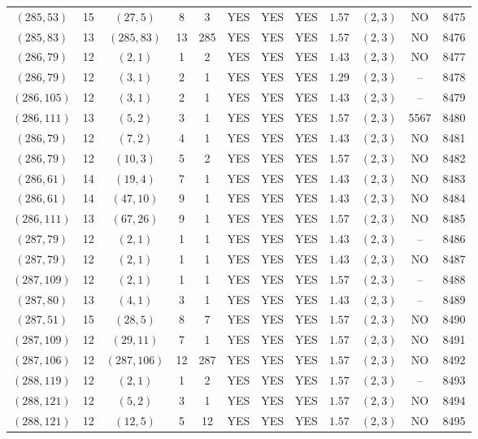 \begin{longtable}{|c|c|c|c|c|c|c|c|c|c|c|c|}
$(285,53)$ & 15 & $(27,5)$ & 8 & 3 & YES & YES & YES & $1.57$ & $(2,3)$ & NO & 8475\\
$(285,83)$ & 13 & $(285,83)$ & 13 & 285 & YES & YES & YES & $1.57$ & $(2,3)$ & NO & 8476\\
$(286,79)$ & 12 & $(2,1)$ & 1 & 2 & YES & YES & YES & $1.43$ & $(2,3)$ & NO & 8477\\
$(286,79)$ & 12 & $(3,1)$ & 2 & 1 & YES & YES & YES & $1.29$ & $(2,3)$ & -- & 8478\\
$(286,105)$ & 12 & $(3,1)$ & 2 & 1 & YES & YES & YES & $1.43$ & $(2,3)$ & -- & 8479\\
$(286,111)$ & 13 & $(5,2)$ & 3 & 1 & YES & YES & YES & $1.57$ & $(2,3)$ & 5567 & 8480\\
$(286,79)$ & 12 & $(7,2)$ & 4 & 1 & YES & YES & YES & $1.43$ & $(2,3)$ & NO & 8481\\
$(286,79)$ & 12 & $(10,3)$ & 5 & 2 & YES & YES & YES & $1.57$ & $(2,3)$ & NO & 8482\\
$(286,61)$ & 14 & $(19,4)$ & 7 & 1 & YES & YES & YES & $1.43$ & $(2,3)$ & NO & 8483\\
$(286,61)$ & 14 & $(47,10)$ & 9 & 1 & YES & YES & YES & $1.43$ & $(2,3)$ & NO & 8484\\
$(286,111)$ & 13 & $(67,26)$ & 9 & 1 & YES & YES & YES & $1.57$ & $(2,3)$ & NO & 8485\\
$(287,79)$ & 12 & $(2,1)$ & 1 & 1 & YES & YES & YES & $1.43$ & $(2,3)$ & -- & 8486\\
$(287,79)$ & 12 & $(2,1)$ & 1 & 1 & YES & YES & YES & $1.43$ & $(2,3)$ & NO & 8487\\
$(287,109)$ & 12 & $(2,1)$ & 1 & 1 & YES & YES & YES & $1.57$ & $(2,3)$ & -- & 8488\\
$(287,80)$ & 13 & $(4,1)$ & 3 & 1 & YES & YES & YES & $1.43$ & $(2,3)$ & -- & 8489\\
$(287,51)$ & 15 & $(28,5)$ & 8 & 7 & YES & YES & YES & $1.57$ & $(2,3)$ & NO & 8490\\
$(287,109)$ & 12 & $(29,11)$ & 7 & 1 & YES & YES & YES & $1.57$ & $(2,3)$ & NO & 8491\\
$(287,106)$ & 12 & $(287,106)$ & 12 & 287 & YES & YES & YES & $1.57$ & $(2,3)$ & NO & 8492\\
$(288,119)$ & 12 & $(2,1)$ & 1 & 2 & YES & YES & YES & $1.57$ & $(2,3)$ & -- & 8493\\
$(288,121)$ & 12 & $(5,2)$ & 3 & 1 & YES & YES & YES & $1.57$ & $(2,3)$ & NO & 8494\\
$(288,121)$ & 12 & $(12,5)$ & 5 & 12 & YES & YES & YES & $1.57$ & $(2,3)$ & NO & 8495\\

\end{longtable}
